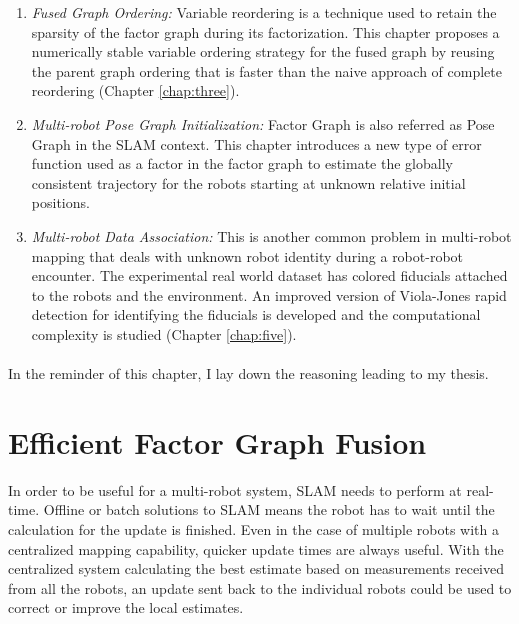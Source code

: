 \begin{enumerate}
\item \textit{Fused Graph Ordering:} Variable reordering is a technique used to retain the sparsity of the factor graph during its factorization. This chapter proposes a numerically stable variable ordering strategy for the fused graph by reusing the parent graph ordering that is faster than the naive approach of complete reordering (Chapter \ref{chap:three}). 

\item \textit{Multi-robot Pose Graph Initialization:} Factor Graph is also referred as Pose Graph in the SLAM context. This chapter introduces a new type of error function used as a factor in the factor graph to estimate the globally consistent trajectory for the robots starting at unknown relative initial positions.

\item \textit{Multi-robot Data Association:} This is another common problem in multi-robot mapping that deals with unknown robot identity during a robot-robot encounter. The experimental real world dataset has colored fiducials attached to the robots and the environment. An improved version of Viola-Jones rapid detection \cite{violajones} for identifying the fiducials is developed and the computational complexity is studied (Chapter \ref{chap:five}). 
\end{enumerate}

\paragraph{}
In the reminder of this chapter, I lay down the reasoning leading to my thesis.

\section{Efficient Factor Graph Fusion}
In order to be useful for a multi-robot system, SLAM needs to perform at real-time. Offline or batch solutions to SLAM means the robot has to wait until the calculation for the update is finished. Even in the case of multiple robots with a centralized mapping capability, quicker update times are always useful. With the centralized system calculating the best estimate based on measurements received from all the robots, an update sent back to the individual robots could be used to correct or improve the local estimates. 

